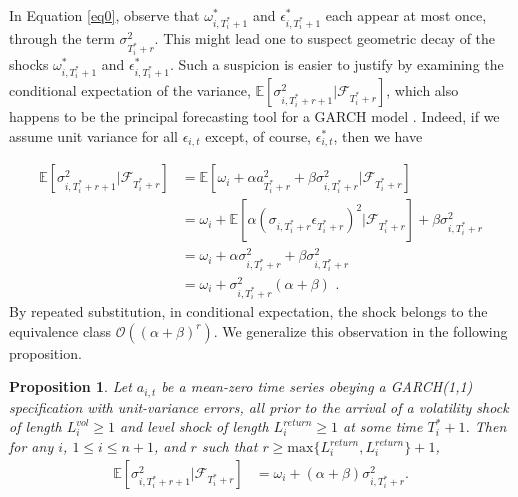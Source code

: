 \documentclass[11pt,3p,review,authoryear]{elsarticle}
\newtheorem{prop}{Proposition}
\theoremstyle{definition}
\begin{document}
In Equation \eqref{eq0}, observe that $\omega_{i,T_{i}^{*}+1}^{*}$ and $\epsilon^{*}_{i,T_{i}^{*}+1}$ 
each appear at most once, through the term $\sigma^{2}_{T_{i}^{*}+r}$.  This might lead one to 
suspect  geometric decay of the shocks $\omega_{i,T_{i}^{*}+1}^{*}$ and $\epsilon^{*}_{i,T_{i}^{*}+1}$.  
Such a suspicion is easier to justify by examining the conditional expectation of the variance, 
$\mathbb{E}[ \sigma^{2}_{i,T_{i}^{*}+r+1} |\mathcal{F}_{T_{i}^{*}+r}]$, which also happens to be the principal forecasting tool for a GARCH model \citep{zivot2009practical}.  Indeed, if we assume unit variance for all $\epsilon_{i,t}$ except, of course, $\epsilon^{*}_{i,t}$, then we have

\begin{align*}
\mathbb{E}[ \sigma^{2}_{i,T_{i}^{*}+r+1} |\mathcal{F}_{T_{i}^{*}+r}] & = \mathbb{E}[\omega_{i} + \alpha a_{T_{i}^{*}+r}^{2} + \beta\sigma^{2}_{i,T_{i}^{*}+r} |\mathcal{F}_{T_{i}^{*}+r}] \\
& = \omega_{i} + \mathbb{E}[\alpha(\sigma_{i,T_{i}^{*}+r}\epsilon_{T_{i}^{*}+r})^{2} |\mathcal{F}_{T_{i}^{*}+r}] + \beta\sigma^{2}_{i,T_{i}^{*}+r} \\
& = \omega_{i} + \alpha\sigma_{i,T_{i}^{*}+r}^{2} + \beta\sigma^{2}_{i,T_{i}^{*}+r} \tag{Due to the unit variance assumption}\\
& = \omega_{i} + \sigma^{2}_{i,T_{i}^{*}+r}(\alpha + \beta) \text{ .} 
\end{align*}
By repeated substitution, in conditional expectation, the shock belongs to the equivalence class $\mathcal{O}((\alpha+\beta)^{r})$.  We generalize this observation in the following proposition.

\begin{prop}\label{decay_prop}
Let $a_{i,t}$ be a mean-zero time series obeying a GARCH(1,1) specification with unit-variance errors, all prior to the arrival of a volatility shock of length $L_{i}^{vol} \geq 1$ and level shock of length $L_{i}^{return}\geq 1$ at some time $T_{i}^{*}+1$.  Then for any $i$, $1\leq i \leq n+1$, and $r$ such that $r \geq \text{max}\{L_{i}^{return},L_{i}^{return}\} + 1$, 
\begin{align*}
\mathbb{E}[ \sigma^{2}_{i,T_{i}^{*}+r+1} |\mathcal{F}_{T_{i}^{*}+r}] & = \omega_{i} + (\alpha + \beta)\sigma^{2}_{i,T_{i}^{*}+r}.
\end{align*}
\end{prop}
\end{document}
